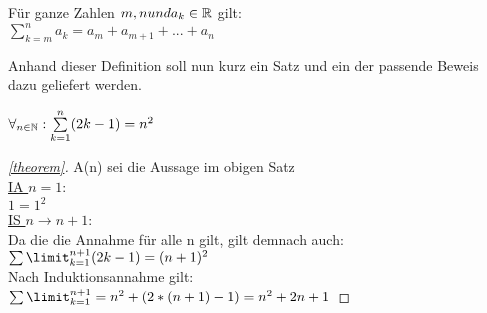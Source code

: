 \begin{df}[Summenschreibweise]
Für ganze Zahlen $m,n und a_k \in \mathbb{R}$ gilt: \\

$\sum\limits_{k=m}^{n}a_k = a_m + a_{m+1}+ ... + a_n$

\end{df}
Anhand dieser Definition soll nun kurz ein Satz und ein der passende Beweis dazu geliefert werden.
\begin{thm}\label{theorem}%

	
	$\forall _{n \in \mathbb{N}} : \sum\limits_{k=1}^{n}(2k-1) = n^2$

\end{thm}
\begin{proof}[\ref{theorem}]%
	A(n) sei die Aussage im obigen Satz \\
	\underline{IA $n=1$}: \\
	$1=1^2$ \\
	\underline{IS $n \rightarrow n+1$}: \\
	Da die die Annahme für alle n gilt, gilt demnach auch: 
	$\sum\limit_{k=1}^{n+1}(2k-1) = (n+1)^2$ \\
	Nach Induktionsannahme gilt: \\
	$\sum\limit_{k=1}^{n+1}= n^2+(2*(n+1)-1) = n^2+2n+1$
	



\end{proof}




